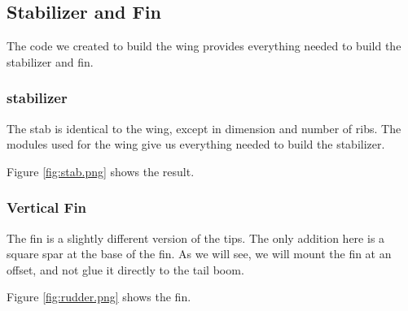 \subsection{Stabilizer and Fin}

The code we created to build the wing provides everything needed to build the
stabilizer and fin.

\subsubsection{stabilizer}

The stab is identical to the wing, except in dimension and
number of ribs. The modules used for the wing give us everything needed to
build the stabilizer.

Figure \ref{fig:stab.png} shows the result.


\subsubsection{Vertical Fin}

The fin is a slightly different version of the tips. The only addition here is
a square spar at the base of the fin. As we will see, we will mount the fin at
an offset, and not glue it directly to the tail boom.

Figure \ref{fig:rudder.png} shows the fin.


